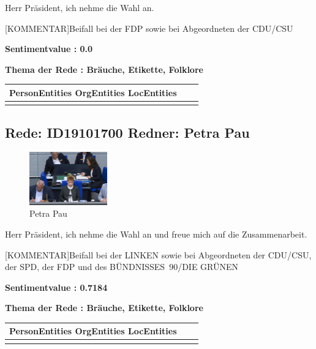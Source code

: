 \documentclass[a4paper,11pt]{article}
\begin{document}
Herr Präsident, ich nehme die Wahl an.

[KOMMENTAR]Beifall bei der FDP sowie bei Abgeordneten der CDU/CSU


\textbf{Sentimentvalue : 0.0}

\textbf{Thema der Rede : Bräuche, Etikette, Folklore}
\vspace*{1cm}

\begin{table}[ht]
\centering
\begin{tabular}{||c | c | c||}
\hline
PersonEntities  OrgEntities  LocEntities \\ 

\hline\hline
\makecell{} 
\makecell{} 
\makecell{}\\
\hline
\end{tabular}
\end{table}
\clearpage


\subsection{Rede: ID19101700  Redner: Petra Pau}

\begin{figure}[ht]

\centering

\includegraphics[width=0.3\textwidth]{Petra_Pau.jpg}

\caption{Petra Pau}

\end{figure}

Herr Präsident, ich nehme die Wahl an und freue mich auf die Zusammenarbeit.

[KOMMENTAR]Beifall bei der LINKEN sowie bei Abgeordneten der CDU/CSU, der SPD, der FDP und des BÜNDNISSES 90/DIE GRÜNEN


\textbf{Sentimentvalue : 0.7184}

\textbf{Thema der Rede : Bräuche, Etikette, Folklore}
\vspace*{1cm}

\begin{table}[ht]
\centering
\begin{tabular}{||c | c | c||}
\hline
PersonEntities  OrgEntities  LocEntities \\ 

\hline\hline
\makecell{} 
\makecell{} 
\makecell{}\\
\hline
\end{tabular}
\end{table}
\clearpage
\end{document}
